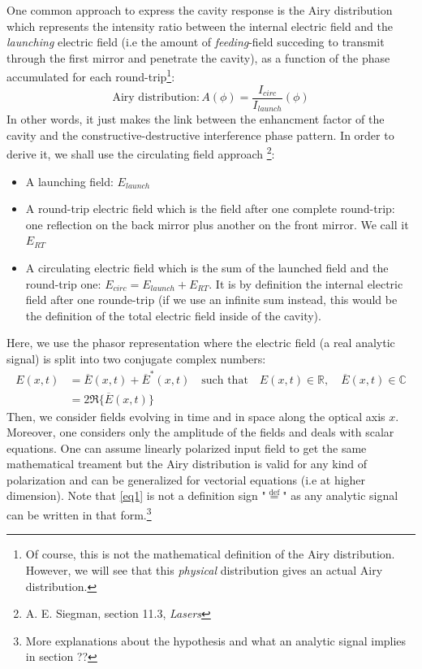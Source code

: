 \documentclass[11pt]{report}
\begin{document}
One common approach to express the cavity response is the Airy distribution which represents the intensity ratio between the internal electric field and the \textit{launching} electric field (i.e the amount of \textit{feeding}-field succeding to transmit through the first mirror and penetrate the cavity), as a function of the phase accumulated for each round-trip\footnote{Of course, this is not the mathematical definition of the Airy distribution. However, we will see that this \textit{physical} distribution gives an actual Airy distribution.}:
\begin{equation}
\label{eqairy}
\textrm{Airy distribution} : A(\phi) = \frac{I_{circ}}{I_{launch}}(\phi)
\end{equation} 
In other words, it just makes the link between the enhancment factor of the cavity and the constructive-destructive interference phase pattern. In order to derive it, we shall use the circulating field approach \footnote{A. E. Siegman, section 11.3, \textit{Lasers}}:
\begin{itemize}
	\item A launching field: $ E_{launch} $
	\item A round-trip electric field which is the field after one complete round-trip: one reflection on the back mirror plus another on the front mirror. We call it $ E_{RT}$
	\item A circulating electric field which is the sum of the launched field and the round-trip one: $ E_{circ} =  E_{launch} + E_{RT}$. It is by definition the internal electric field after one rounde-trip (if we use an infinite sum instead, this would be the definition of the total electric field inside of the cavity).
\end{itemize}

Here, we use the phasor representation where the electric field (a real analytic signal) is split into two conjugate complex numbers:
\begin{align} 
\label{eq1}
E(x, t) &= \overline{E}(x, t) + \overline{E}^*(x, t) \quad \textrm{such that} \quad E(x, t) \in \mathbb{R}, \quad \overline{E}(x, t) \in \mathbb{C} \\\label{eq2}
&= 2 \Re \{  \overline{E}(x, t) \} 
\end{align}
Then, we consider fields evolving in time and in space along the optical axis $ x$. Moreover, one considers only the amplitude of the fields and deals with scalar equations. One can assume linearly polarized input field to get the same mathematical treament but the Airy distribution is valid for any kind of polarization and can be generalized for vectorial equations (i.e at higher dimension). Note that \eqref{eq1} is not a definition sign "$\stackrel{\text{def}}{=}$" as any analytic signal can be written in that form.\footnote{More explanations about the hypothesis and what an analytic signal implies in section ??}
\end{document}
